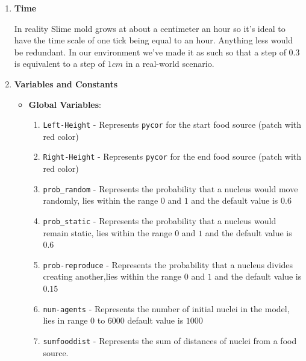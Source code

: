\documentclass[a4paper, 11pt]{article}
\begin{document}
\begin{enumerate}
    \item \textbf{Time}\par
    In reality Slime mold grows at about a centimeter an hour so it’s ideal to have the time scale of one tick being equal to an hour. Anything less would be redundant. In our environment we've made it as such so that a step of $0.3$ is equivalent to a step of $1 cm$ in a real-world scenario.
    
    \item \textbf{Variables and Constants} 
    \begin{itemize}
        \item \textbf{Global Variables}:
    \begin{enumerate}
        \item \texttt{Left-Height} - Represents \texttt{pycor} for the start food source (patch with red color)
        \item \texttt{Right-Height} - Represents \texttt{pycor} for the end food source (patch with red color)
        \item \texttt{prob\_random} - Represents the probability that a nucleus would move randomly, lies within the range $0$ and $1$ and the default value is $0.6$
        \item \texttt{prob\_static} - Represents the probability that a nucleus would remain static, lies within the range $0$ and $1$ and the default value is $0.6$
        \item \texttt{prob-reproduce} - Represents the probability that a nucleus divides creating another,lies within the range $0$ and $1$ and the default value is $0.15$
        \item \texttt{num-agents} - Represents the number of initial nuclei in the model, lies in range $0$ to $6000$ default value is $1000$
        \item \texttt{sumfooddist} - Represents the sum of distances of nuclei from a food source.
    \end{enumerate}
    

\end{itemize}
\end{enumerate}
\end{document}
